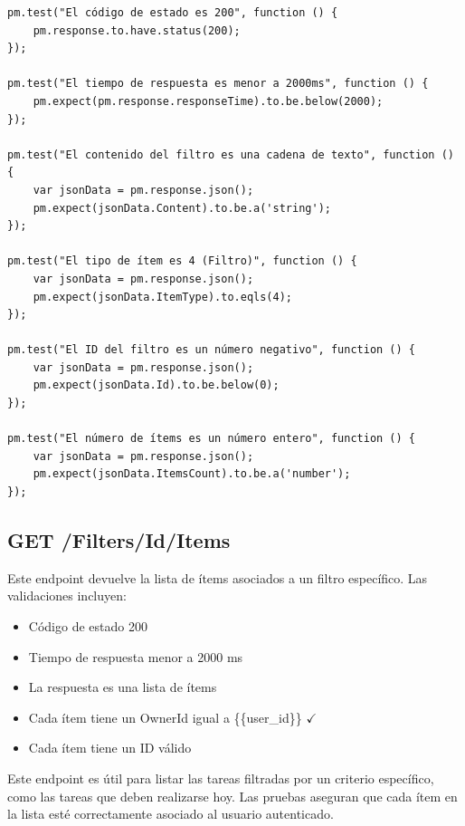 \documentclass{report}
\begin{document}
\begin{lstlisting}
pm.test("El código de estado es 200", function () {
    pm.response.to.have.status(200);
});

pm.test("El tiempo de respuesta es menor a 2000ms", function () {
    pm.expect(pm.response.responseTime).to.be.below(2000);
});

pm.test("El contenido del filtro es una cadena de texto", function () {
    var jsonData = pm.response.json();
    pm.expect(jsonData.Content).to.be.a('string');
});

pm.test("El tipo de ítem es 4 (Filtro)", function () {
    var jsonData = pm.response.json();
    pm.expect(jsonData.ItemType).to.eqls(4);
});

pm.test("El ID del filtro es un número negativo", function () {
    var jsonData = pm.response.json();
    pm.expect(jsonData.Id).to.be.below(0);
});

pm.test("El número de ítems es un número entero", function () {
    var jsonData = pm.response.json();
    pm.expect(jsonData.ItemsCount).to.be.a('number');
});
\end{lstlisting}

\subsection{GET /Filters/Id/Items}
Este endpoint devuelve la lista de ítems asociados a un filtro específico. Las validaciones incluyen:
\begin{itemize}
    \item Código de estado 200 \checkmark
    \item Tiempo de respuesta menor a 2000 ms \checkmark
    \item La respuesta es una lista de ítems \checkmark
    \item Cada ítem tiene un OwnerId igual a \{\{user\_id\}\} $\checkmark$
    \item Cada ítem tiene un ID válido \checkmark
\end{itemize}

Este endpoint es útil para listar las tareas filtradas por un criterio específico, como las tareas que deben realizarse hoy. Las pruebas aseguran que cada ítem en la lista esté correctamente asociado al usuario autenticado.
\end{document}

